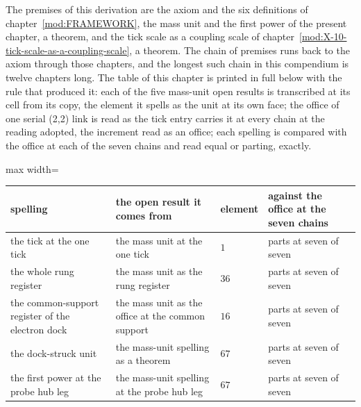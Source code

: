 \begin{chproof}[instrument]
The premises of this derivation are the axiom and the six definitions of chapter~\ref{mod:FRAMEWORK}, the mass unit and the first power of the present chapter, a theorem, and the tick scale as a coupling scale of chapter~\ref{mod:X-10-tick-scale-as-a-coupling-scale}, a theorem. The chain of premises runs back to the axiom through those chapters, and the longest such chain in this compendium is twelve chapters long.
The table of this chapter is printed in full below with the rule that produced it: each of the five mass-unit open results is transcribed at its cell from its copy, the element it spells as the unit at its own face; the office of one serial (2,2) link is read as the tick entry carries it at every chain at the reading adopted, the increment read as an office; each spelling is compared with the office at each of the seven chains and read equal or parting, exactly.
\begin{center}\begin{adjustbox}{max width=\linewidth}\begin{tabular}{llll}\hline spelling & the open result it comes from & element & against the office at the seven chains \\ \hline the tick at the one tick & the mass unit at the one tick & $1$ & parts at seven of seven \\ the whole rung register & the mass unit as the rung register & $36$ & parts at seven of seven \\ the common-support register of the electron dock & the mass unit as the office at the common support & $16$ & parts at seven of seven \\ the dock-struck unit & the mass-unit spelling as a theorem & $67$ & parts at seven of seven \\ the first power at the probe hub leg & the mass-unit spelling at the probe hub leg & $67$ & parts at seven of seven \\ \hline \end{tabular}\end{adjustbox}\end{center}

\end{chproof}
